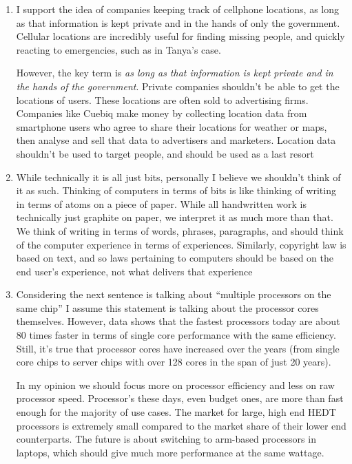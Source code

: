\documentclass{scrartcl}
\begin{document}
\begin{enumerate}
\item I support the idea of companies keeping track of cellphone locations, as long
as that information is kept private and in the hands of only the government.
Cellular locations are incredibly useful for finding missing people, and
quickly reacting to emergencies, such as in Tanya's case.

However, the key term is \emph{as long as that information is kept private and in
the hands of the government}. Private companies shouldn't be able to get the
locations of users. These locations are often sold to advertising firms.
Companies like Cuebiq make money by collecting location data from smartphone
users who agree to share their locations for weather or maps, then analyse
and sell that data to advertisers and marketers. Location data shouldn't be
used to target people, and should be used as a last resort

\item While technically it is all just bits, personally I believe we shouldn't
think of it as such. Thinking of computers in terms of bits is like thinking
of writing in terms of atoms on a piece of paper. While all handwritten work
is technically just graphite on paper, we interpret it as much more than
that. We think of writing in terms of words, phrases, paragraphs, and should
think of the computer experience in terms of experiences. Similarly,
copyright law is based on text, and so laws pertaining to computers should be
based on the end user's experience, not what delivers that experience

\item Considering the next sentence is talking about ``multiple processors on the
same chip'' I assume this statement is talking about the processor cores
themselves. However, data shows that the fastest processors today are about
80 times faster in terms of single core performance with the same efficiency.
Still, it's true that processor cores have increased over the years (from
single core chips to server chips with over 128 cores in the span of just 20
years).

In my opinion we should focus more on processor efficiency and less on raw
processor speed. Processor's these days, even budget ones, are more than fast
enough for the majority of use cases. The market for large, high end HEDT
processors is extremely small compared to the market share of their lower end
counterparts. The future is about switching to arm-based processors in
laptops, which should give much more performance at the same wattage.


\end{enumerate}
\end{document}
